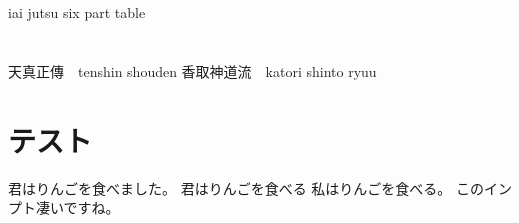 \documentclass[dvipdfmx, a4paper, 12pt]{utarticle}
\begin{document}
\begin{CJK*}{UTF8}{min}
\CJKtilde
\begin{landscape}
\newpage
\pagestyle{empty}
\section{}
iai jutsu six part table
\section{} 

\newpage
\pagestyle{empty}
\begin{huge}
天真正傳　tenshin shouden
香取神道流　katori shinto ryuu
\end{huge}

\section{テスト}
君はりんごを食べました。
君はりんごを食べる
私はりんごを食べる。
このインプト凄いですね。

\end{landscape}
\end{CJK*}
\end{document}
